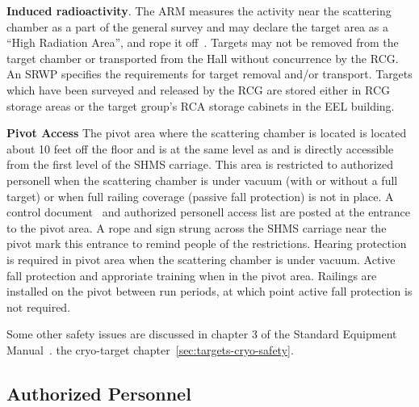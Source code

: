 {\begin{safetyen}{0}{0}
\begin{list}{.~}{\setlength{\itemsep}{-0.15cm}}
  \item {\bf Induced radioactivity}. The ARM measures the activity
    near the scattering chamber as a part of the general survey and
    may declare the target area as a ``High Radiation Area'', and rope
    it off~\cite{RWIcebaf}.  Targets may not be removed from the
    target chamber or transported from the Hall without concurrence by
    the RCG. An SRWP specifies the requirements for target removal
    and/or transport. Targets which have been surveyed and released by
    the RCG are stored either in RCG storage areas or the target
    group's RCA storage cabinets in the EEL building.

\item {\bf Pivot Access} The pivot area where the scattering
  chamber is located is located about 10 feet off the floor and is
  at the same level as and is directly accessible from the first level
  of the SHMS carriage.  This area is restricted
  to authorized personell
  when the scattering chamber
  is under vacuum (with or without a full target) or when full railing
  coverage (passive fall protection) is not in place.  A control
  document~\cite{PivotOSP} and authorized personell access list
  are posted at the entrance to the pivot area.  A rope and sign strung
  across the SHMS carriage near the pivot
  mark this entrance to remind people of the restrictions.
  Hearing protection is required in pivot area when the scattering chamber
  is under vacuum.
  Active fall protection and approriate training when in the pivot area.
  Railings are installed on the pivot between run periods, at which
  point active fall protection is not required.

\end{list}

Some other safety issues are discussed in
\ifdefined\PIVOTOSP
chapter 3 of the Standard Equipment Manual~\cite{HallCosp}.
\else
the cryo-target chapter~\ref{sec:targets-cryo-safety}.
\fi


\subsection[Authorized  Personnel]{Authorized  Personnel}


\end{safetyen}}
